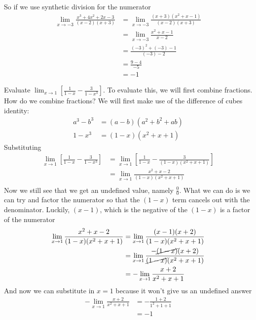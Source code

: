\documentclass[working]{tuftebook}
\begin{document}
\begin{fullwidth}
    So if we use synthetic division for the numerator 
    \begin{align*}
        \lim_{x\to -3} \frac{x^3+4x^2+2x-3}{(x-2)(x+3)}&= \lim_{x\to -3} \frac{(x+3)(x^2+x-1)}{(x-2)(x+3)}\\
                                                       &= \lim_{x\to -3}\frac{x^2+x-1}{x-2}\\ 
                                                       &= \frac{(-3)^2+(-3)-1}{(-3)-2}\\ 
                                                       &= \frac{9-4}{-5}\\ 
                                                       &=-1
    \end{align*}
\begin{eg}
    Evaluate $\displaystyle \lim_{x\to 1} \left[ \frac{1}{1-x}- \frac{3}{1-x^3} \right]$. To evaluate this, we will first combine fractions. How do we combine fractions? We will first make use of the difference of cubes identity:
    \begin{align*}
        a^3-b^3&= (a-b)(a^2+b^2+ab)\\
        1-x^3&=(1-x)(x^2+x+1)
    \end{align*}
    Substituting
    \begin{align*}
        \lim_{x\to 1} \left[ \frac{1}{1-x}- \frac{3}{1-x^3} \right]&= \lim_{x\to 1} \left[ \frac{1}{1-x}- \frac{3}{(1-x)(x^2+x+1)} \right]\\
                                                                   &= \lim_{x\to 1} \frac{x^2+x-2}{(1-x)(x^2+x+1)}\\ 
    \end{align*}
    Now we still see that we get an undefined value, namely $ \frac{0}{0}$. What we can do is we can try and factor the numerator so that the $(1-x)$ term cancels out with the denominator. Luckily, $(x-1)$, which is the negative of the $(1-x)$ is a factor of the numerator
    \begin{align*}
        \lim_{x\to 1} \frac{x^2+x-2}{(1-x)(x^2+x+1)}&= \lim_{x\to 1} \frac{(x-1)(x+2)}{(1-x)(x^2+x+1)}\\
                                                    &= \lim_{x\to 1} \frac{-\cancel{(1-x)}(x+2)}{\cancel{(1-x)}(x^2+x+1)}\\ 
                                                    &=- \lim_{x\to 1} \frac{x+2}{x^2+x+1}\\ 
    \end{align*}
    And now we can substitute in $x=1$ because it won't give us an undefined answer 
    \begin{align*}
        - \lim_{x\to 1} \frac{x+2}{x^2+x+1}&= - \frac{1+2}{1^2+1+1}\\
                                           &=-1
    \end{align*}
\end{eg}
\end{fullwidth}
\end{document}

